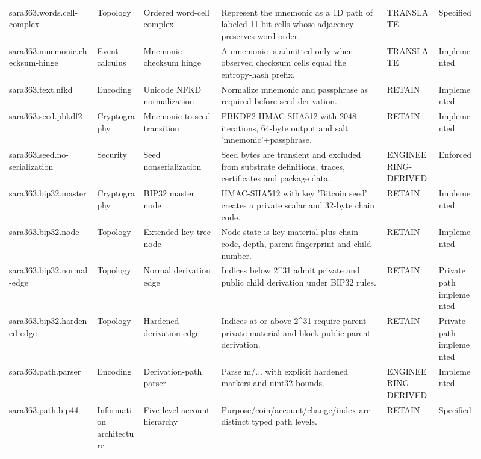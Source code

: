 \begin{longtable}{@{}p{0.17\linewidth} p{0.09\linewidth} p{0.15\linewidth} p{0.32\linewidth} p{0.10\linewidth} p{0.08\linewidth}@{}}
\addlinespace[1.5pt]
sara363.words.cell-complex & Topology & Ordered word-cell complex & Represent the mnemonic as a 1D path of labeled 11-bit cells whose adjacency preserves word order. & TRANSLATE & Specified\\
\addlinespace[1.5pt]
sara363.mnemonic.checksum-hinge & Event calculus & Mnemonic checksum hinge & A mnemonic is admitted only when observed checksum cells equal the entropy-hash prefix. & TRANSLATE & Implemented\\
\addlinespace[1.5pt]
sara363.text.nfkd & Encoding & Unicode NFKD normalization & Normalize mnemonic and passphrase as required before seed derivation. & RETAIN & Implemented\\
\addlinespace[1.5pt]
sara363.seed.pbkdf2 & Cryptography & Mnemonic-to-seed transition & PBKDF2-HMAC-SHA512 with 2048 iterations, 64-byte output and salt 'mnemonic'+passphrase. & RETAIN & Implemented\\
\addlinespace[1.5pt]
sara363.seed.no-serialization & Security & Seed nonserialization & Seed bytes are transient and excluded from substrate definitions, traces, certificates and package data. & ENGINEERING-DERIVED & Enforced\\
\addlinespace[1.5pt]
sara363.bip32.master & Cryptography & BIP32 master node & HMAC-SHA512 with key 'Bitcoin seed' creates a private scalar and 32-byte chain code. & RETAIN & Implemented\\
\addlinespace[1.5pt]
sara363.bip32.node & Topology & Extended-key tree node & Node state is key material plus chain code, depth, parent fingerprint and child number. & RETAIN & Implemented\\
\addlinespace[1.5pt]
sara363.bip32.normal-edge & Topology & Normal derivation edge & Indices below 2\textasciicircum{}31 admit private and public child derivation under BIP32 rules. & RETAIN & Private path implemented\\
\addlinespace[1.5pt]
sara363.bip32.hardened-edge & Topology & Hardened derivation edge & Indices at or above 2\textasciicircum{}31 require parent private material and block public-parent derivation. & RETAIN & Private path implemented\\
\addlinespace[1.5pt]
sara363.path.parser & Encoding & Derivation-path parser & Parse m/... with explicit hardened markers and uint32 bounds. & ENGINEERING-DERIVED & Implemented\\
\addlinespace[1.5pt]
sara363.path.bip44 & Information architecture & Five-level account hierarchy & Purpose/coin/account/change/index are distinct typed path levels. & RETAIN & Specified\\

\end{longtable}
